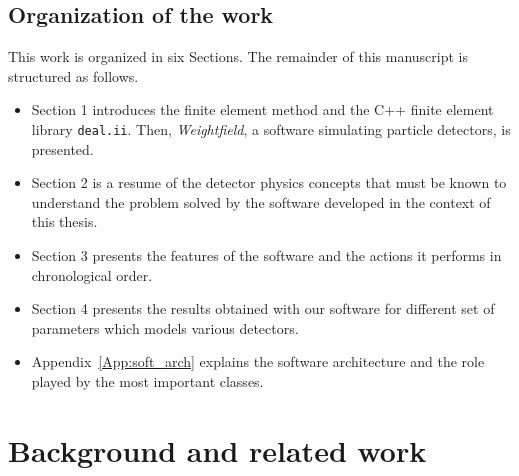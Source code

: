 \documentclass[11pt]{article}
\begin{document}

	\subsection*{Organization of the work}

		This work is organized in six Sections. The remainder of this manuscript
		is structured as follows.

		\begin{itemize}
			\item Section 1 introduces the finite element method and the
			C++ finite element library \texttt{deal.ii}. Then, \textit{Weightfield},
			a software simulating particle detectors, is presented.
			\item Section 2 is a resume of the detector physics concepts that must be
			known to understand the problem solved by the software developed in the
			context of this thesis.
			\item Section 3 presents the features of the software and the actions
			it performs in chronological order.

			\item Section 4 presents the results obtained with our software for
			different set of parameters which models various detectors.

			\item Appendix~\ref{App:soft_arch} explains the software architecture and the role played by
			the most important classes.
		\end{itemize}


\newpage
\section{Background and related work}
\end{document}
